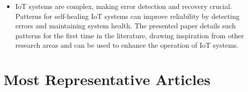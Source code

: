 \documentclass[11pt]{article}
\begin{document}
\begin{itemize}
     Smart home IoT systems are becoming increasingly complex, creating challenges for managing interactions and identifying causes of issues. Low-code development solutions have emerged to address these challenges, but they sacrifice ease of use and accessibility. The paper presents a conversational interface called Jarvis that allows users to manage IoT systems through natural language and time-based rules, with a feasibility experiment showing its intuitive usability for common end-users, showcasing the relevance of such approaches.
     
    \item {}
    
    IoT systems are complex, making error detection and recovery crucial. Patterns for self-healing IoT systems can improve reliability by detecting errors and maintaining system health. The presented paper details such patterns for the first time in the literature, drawing inspiration from other research areas and can be used to enhance the operation of IoT systems.
    
\end{itemize}
	

\section{Most Representative Articles}
\end{document}
